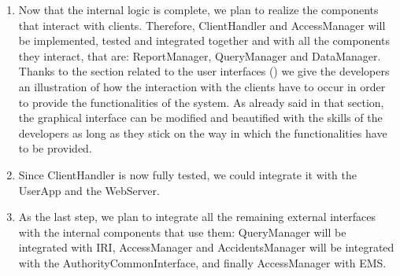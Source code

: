 \begin{enumerate}
			\item Now that the internal logic is complete, we plan to realize the components that interact with clients. Therefore, ClientHandler and AccessManager will be implemented, tested and integrated together and with all the components they interact, that are: ReportManager, QueryManager and DataManager. Thanks to the section related to the user interfaces () we give the developers an illustration of how the interaction with the clients have to occur in order to provide the functionalities of the system. As already said in that section, the graphical interface can be modified and beautified with the skills of the developers as long as they stick on the way in which the functionalities have to be provided.
			
			\item Since ClientHandler is now fully tested, we could integrate it with the UserApp and the WebServer.
			
			\item As the last step, we plan to integrate all the remaining external interfaces with the internal components that use them: QueryManager will be integrated with IRI, AccessManager and AccidentsManager will be integrated with the AuthorityCommonInterface, and finally AccessManager with EMS. 
		\end{enumerate}